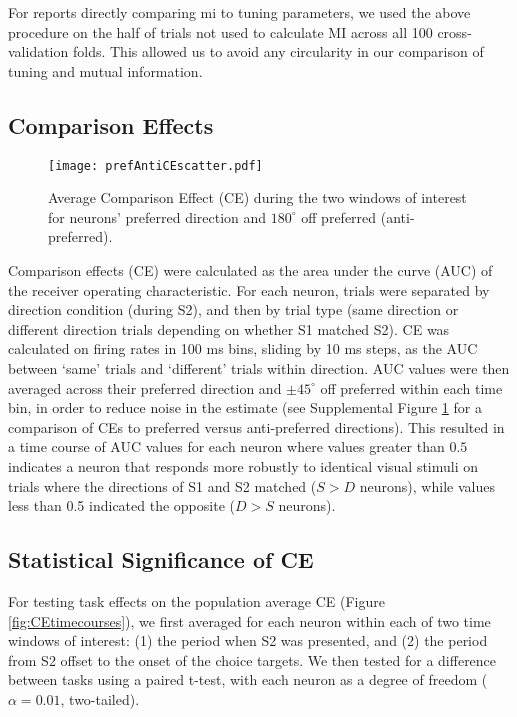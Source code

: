 For reports directly comparing \gls{mi} to tuning parameters, we used the above procedure on the half of trials not used to calculate MI across all 100 cross-validation folds. This allowed us to avoid any circularity in our comparison of tuning and mutual information. 

\subsection*{Comparison Effects}


	\setcounter{scratchcounter}{\value{figure}}
	\setcounter{figure}{\thesupplementcounter}
	\renewcommand{\figurename}{Supplemental Figure}
	\begin{figure}
		\centering
		\texttt{[image: prefAntiCEscatter.pdf]}
		\caption{Average Comparison Effect (CE) during the two windows of interest for neurons' preferred direction and $180^{\circ}$ off preferred (anti-preferred).  }
		\label{fig:suppCe} %
	\end{figure}
	\setcounter{supplementcounter}{\value{figure}}
	\setcounter{figure}{\thescratchcounter}
	\renewcommand{\figurename}{Figure}
	\addtocounter{page}{-1}
	\thispagestyle{empty}
	\clearpage

Comparison effects (CE) were calculated as the area under the curve (AUC) of the receiver operating characteristic. For each neuron, trials were separated by direction condition (during S2), and then by trial type (same direction or different direction trials depending on whether S1 matched S2).\label{rev:ceSep} CE was calculated on firing rates in 100 ms bins, sliding by 10 ms steps, as the AUC between `same' trials and `different' trials within direction. AUC values were then averaged across their preferred direction and $\pm 45^{\circ}$ off preferred within each time bin, in order to reduce noise in the estimate (see Supplemental Figure \ref{fig:suppCe} for a comparison of CEs to preferred versus anti-preferred directions). This resulted in a time course of AUC values for each neuron where values greater than $0.5$ indicates a neuron that responds more robustly to identical visual stimuli on trials where the directions of S1 and S2 matched ($S>D$ neurons), while values less than 0.5 indicated the opposite ($D>S$ neurons). 

\subsection*{Statistical Significance of CE}
For testing task effects on the population average CE (Figure \ref{fig:CEtimecourses}), we first averaged for each neuron within each of two time windows of interest: (1) the period when S2 was presented, and (2) the period from S2 offset to the onset of the choice targets. 
We then tested for a difference between tasks using a paired t-test, with each neuron as a degree of freedom ($\alpha=0.01$, two-tailed).

